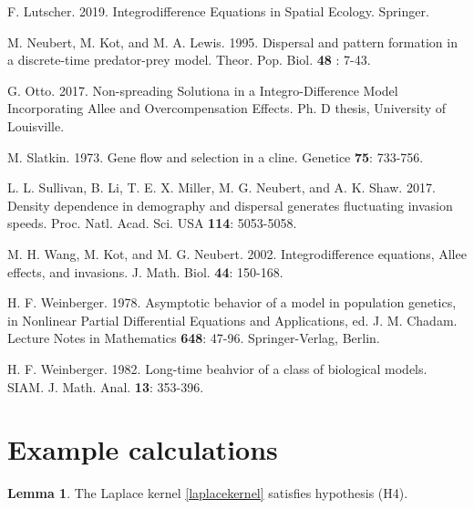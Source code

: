 \documentclass[11pt]{article}
\theoremstyle{definition}
\newtheorem{lem}[thm]{Lemma}
\numberwithin{equation}{section}
\numberwithin{thm}{section}
\begin{document}
\begin{thebibliography}{9}
F. Lutscher. 2019. Integrodifference Equations in Spatial Ecology.  Springer.


 M. Neubert, M. Kot, and M. A. Lewis. 1995. Dispersal and pattern formation in a
discrete-time predator-prey model. Theor. Pop. Biol. {\bf 48}
: 7-43.

 G. Otto. 2017. Non-spreading Solutiona in a Integro-Difference Model Incorporating Allee and Overcompensation Effects. Ph. D thesis, University of Louisville.

 M. Slatkin. 1973. Gene flow and selection in a cline.
Genetice {\bf 75}: 733-756.



 L. L. Sullivan, B. Li, T. E. X. Miller, M. G. Neubert, and A. K. Shaw. 2017.
Density dependence in demography and dispersal generates fluctuating invasion speeds. Proc. Natl. Acad. Sci. USA {\bf
114}: 5053-5058.


 M. H. Wang, M. Kot, and M. G. Neubert. 2002. Integrodifference equations, Allee effects, and
invasions. J. Math. Biol. {\bf 44}: 150-168.

 H. F. Weinberger. 1978. Asymptotic behavior of a model in  population genetics,
in Nonlinear Partial Differential Equations  and Applications, ed.
J. M. Chadam. Lecture Notes in Mathematics {\bf 648}: 47-96.
Springer-Verlag, Berlin.

 H. F.  Weinberger. 1982. Long-time beahvior of a class of biological models. SIAM. J.
Math. Anal. {\bf 13}: 353-396.

\end{thebibliography}


\appendix

\section{Example calculations}

\begin{lem}
The Laplace kernel \eqref{laplacekernel} satisfies hypothesis (H4).
\end{lem}
\end{document}
